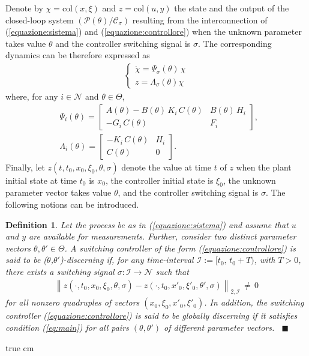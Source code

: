 \documentclass[letterpaper, 10 pt, conference]{ieeetran}
\def\qedp{\hspace*{\fill}~{\tiny $\blacksquare$}}
\def\salt{\vskip 0.2 true cm}
\newtheorem{itdefinition}{Definition}
\newenvironment{definition}{\begin{itdefinition}\rm}{\end{itdefinition}}
\begin{document}
Denote by $\chi = \textrm{col} (x,\xi)$ and $z = \textrm{col} (u,y)$
the state and the output of the closed-loop system $(\mathcal P(\theta) / \mathcal C_\sigma)$ resulting from 
the interconnection of (\ref{equazione:sistema}) and (\ref{equazione:controllore})
when the unknown parameter takes value $\theta$ and the controller switching signal is $\sigma$.
The corresponding dynamics can be therefore expressed as
{\setlength\arraycolsep{1pt}
\label{}
\begin{eqnarray}\label{eq:closed-loop}
\left\{ \begin{array}{l} 
\dot \chi = \Psi_{\sigma}(\theta)  \, \chi  \\
z= \Lambda_{\sigma}(\theta) \chi
\end{array} \right.
\end{eqnarray}}where, for any $i \in \mathcal N$ and $\theta \in \Theta$,
\begin{eqnarray}
&& \Psi_{i}(\theta) = \left [ \begin{array}{cc} A(\theta) - B(\theta)\,K_i\,C(\theta)
& B(\theta) \, H_i \\ -G_i \, C(\theta) & F_i
\end{array} \right ], \quad \\
&& \Lambda_{i}(\theta) = \left [
\begin{array}{cc} -K_i\, C(\theta) & H_i
\\  C(\theta) & 0 \end{array} \right ] .
\nonumber
\end{eqnarray} 
Finally, let 
$
z(t,t_0,x_0,\xi_{0},\theta,\sigma)
$
denote the value at time $t$ of $z$ 
when the plant initial state at time $t_0$ is $x_{0}$, 
the controller initial state is $\xi_{0}$, the unknown parameter vector takes value $\theta$, and the controller switching signal is $\sigma$.
The following notions 
can be introduced. 

\begin{definition} \label{def:disc:CLD} 
Let the process be as in (\ref{equazione:sistema}) and assume that $u$ and $y$ are available for measurements.
Further, consider two distinct parameter vectors $\theta, \theta' \in \Theta$.
A switching controller of the form (\ref{equazione:controllore}) 
is said to be ($\theta$,$\theta'$)-\emph{discerning} if, 
for any time-interval $\mathcal I:= [t_0,\, t_0+T)$, with $T>0$, 
there exists a switching signal $\sigma: \mathcal I \rightarrow \mathcal N $ such that
\begin{eqnarray} \label{eq:main}
\left \| z(\cdot,t_0,x_0,\xi_{0},\theta,\sigma) - z(\cdot,t_0,x'_0,\xi'_{0},\theta',\sigma)  \right \|_{2, \mathcal I} \,\ne\, 0
\end{eqnarray}
for all nonzero quadruples of vectors
$(x_0,\xi_{0},x'_0,\xi'_{0})$. 
In addition, the switching controller (\ref{equazione:controllore}) is said to be 
\emph{globally discerning} if it satisfies condition (\ref{eq:main}) for all 
pairs $(\theta,\theta')$ of different parameter vectors.
\qedp
\end{definition} 
\salt
\end{document}
